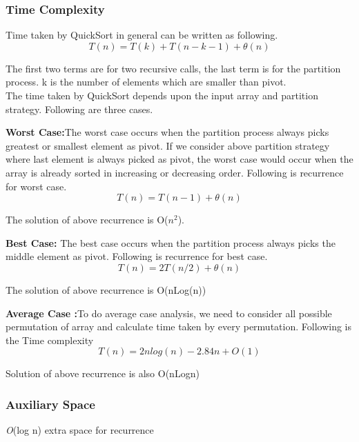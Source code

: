 \documentclass[12pt]{article}
\begin{document}
\subsubsection{Time Complexity}
\par Time taken by QuickSort in general can be written as following\cite{Hoare}.
\begin{equation}
T(n) = T(k) + T(n-k-1) + \theta(n)
\end{equation}
\par The first two terms are for two recursive calls, the last term is for the partition process. k is the number of elements which are smaller than pivot.\\
The time taken by QuickSort depends upon the input array and partition strategy. Following are three cases.\\
\par \textbf {Worst Case:}The worst case occurs when the partition process always picks greatest or smallest element as pivot. If we consider above partition strategy where last element is always picked as pivot, the worst case would occur when the array is already sorted in increasing or decreasing order. Following is recurrence for worst case\cite{Hoare}.
\begin{equation}
T(n) = T(n-1) + \theta(n)
\end{equation}
\par The solution of above recurrence is O($n^2$).\\ 
\par {\bfseries{Best Case:}}
The best case occurs when the partition process always picks the middle element as pivot. Following is recurrence for best case\cite{Hoare}.
\begin{equation}
T(n) = 2T(n/2) + \theta(n)
\end{equation}
\par The solution of above recurrence is O(nLog(n)) 
\cite{master}\\
\par {\textbf {Average Case :}}To do average case analysis, we need to consider all possible permutation of array and calculate time taken by every permutation. Following is the Time complexity \cite{cormen}
\begin{equation}
T(n)=2nlog(n) - 2.84n + O(1)
\end{equation}
\par Solution of above recurrence is also O(nLogn) \cite{cormen}
\subsubsection{Auxiliary Space}
\hspace{10pt} \textit O(log n) extra space for recurrence 
\end{document}
